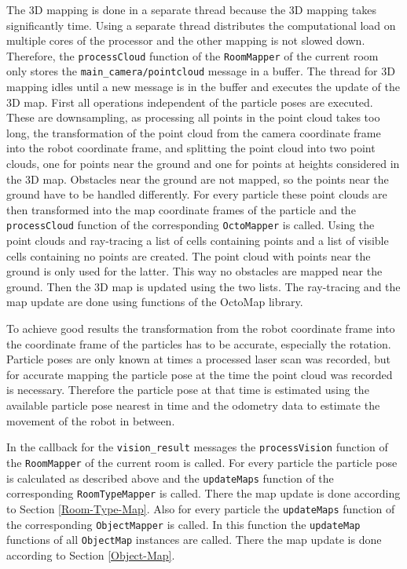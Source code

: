The 3D mapping is done in a separate thread because the 3D mapping takes significantly time. Using a separate thread distributes the computational load on multiple cores of the processor and the other mapping is not slowed down. Therefore, the \texttt{processCloud} function of the \texttt{RoomMapper} of the current room only stores the \texttt{main{\_}camera/pointcloud} message in a buffer. The thread for 3D mapping idles until a new message is in the buffer and executes the update of the 3D map. First all operations independent of the particle poses are executed. These are downsampling, as processing all points in the point cloud takes too long, the transformation of the point cloud from the camera coordinate frame into the robot coordinate frame, and splitting the point cloud into two point clouds, one for points near the ground and one for points at heights considered in the 3D map. Obstacles near the ground are not mapped, so the points near the ground have to be handled differently. For every particle these point clouds are then transformed into the map coordinate frames of the particle and the \texttt{processCloud} function of the corresponding \texttt{OctoMapper} is called. Using the point clouds and ray-tracing a list of cells containing points and a list of visible cells containing no points are created. The point cloud with points near the ground is only used for the latter. This way no obstacles are mapped near the ground. Then the 3D map is updated using the two lists. The ray-tracing and the map update are done using functions of the OctoMap library. 

To achieve good results the transformation from the robot coordinate frame into the coordinate frame of the particles has to be accurate, especially the rotation. Particle poses are only known at times a processed laser scan was recorded, but for accurate mapping the particle pose at the time the point cloud was recorded is necessary. Therefore the particle pose at that time is estimated using the available particle pose nearest in time and the odometry data to estimate the movement of the robot in between. 

In the callback for the \texttt{vision{\_}result} messages the \texttt{processVision} function of the \texttt{RoomMapper} of the current room is called. For every particle the particle pose is calculated as described above and the \texttt{updateMaps} function of the corresponding \texttt{RoomTypeMapper} is called. There the map update is done according to Section \ref{Room-Type-Map}. Also for every particle the \texttt{updateMaps} function of the corresponding \texttt{ObjectMapper} is called. In this function the \texttt{updateMap} functions of all \texttt{ObjectMap} instances are called. There the map update is done according to Section \ref{Object-Map}.

